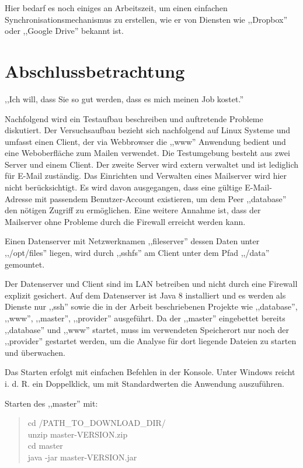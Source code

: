 \documentclass[oneside, ngerman, toc=bibliography,bibliography=totoc,listof=entryprefix, open=right,numbers=noenddot,fontsize=12pt]{scrbook}
\newcommand\chapmd[2]{\begin{mdframed}[%
		rightline=false,leftline=false,topline=false,bottomline=false,frametitlerule=false,
		userdefinedwidth=\textwidth,frametitlealignment=\flushright, %
		frametitlerulecolor=black,frametitle={\small #1}]
		\flushright{} \footnotesize{} #2
	\end{mdframed}}
\begin{document}
\bigskip

Hier bedarf es noch einiges an Arbeitszeit, um einen einfachen Synchronisationsmechanismus zu erstellen, wie er von Diensten wie ,,Dropbox'' oder ,,Google Drive'' bekannt ist.

 
\chapter{Abschlussbetrachtung}
 
\chapmd{Projektmanagementkurs Universität Duisburg-Essen}{,,Ich will, dass Sie so gut werden, dass es mich meinen Job kostet.''}


Nachfolgend wird ein Testaufbau beschreiben und auftretende Probleme diskutiert. Der Versuchsaufbau bezieht sich nachfolgend auf Linux Systeme und umfasst einen Client, der via Webbrowser die ,,www'' Anwendung bedient und eine Weboberfläche zum Mailen verwendet.
Die Testumgebung besteht aus zwei Server und einem Client. Der zweite Server wird extern verwaltet und ist lediglich für E-Mail zuständig. Das Einrichten und Verwalten eines Mailserver wird hier nicht berücksichtigt. Es wird davon ausgegangen, dass eine gültige E-Mail-Adresse mit passendem Benutzer-Account existieren, um dem Peer ,,database'' den nötigen Zugriff zu ermöglichen. Eine weitere Annahme ist, dass der Mailserver ohne Probleme durch die Firewall erreicht werden kann.

Einen Datenserver mit Netzwerknamen ,,fileserver'' dessen Daten unter ,,/opt/files'' liegen, wird durch ,,sshfs'' am Client unter dem Pfad ,,/data'' gemountet.

Der Datenserver und Client sind im LAN betreiben und nicht durch eine Firewall explizit gesichert. Auf dem Datenserver ist Java 8 installiert und es werden als Dienste nur ,,ssh'' sowie die in der Arbeit beschriebenen Projekte wie ,,database'', ,,www'', ,,master'', ,,provider'' ausgeführt. Da der ,,master'' eingebettet bereits ,,database'' und ,,www'' startet, muss im verwendeten Speicherort nur noch der ,,provider'' gestartet werden, um die Analyse für  dort liegende Dateien zu starten und überwachen.

Das Starten erfolgt mit einfachen Befehlen in der Konsole. Unter Windows reicht i. d. R. ein Doppelklick, um mit Standardwerten die Anwendung auszuführen. 

\bigskip

Starten des ,,master'' mit: 
\begin{quote}
    cd /PATH\_TO\_DOWNLOAD\_DIR/ \\
    unzip master-VERSION.zip \\
    cd master \\
    java -jar master-VERSION.jar 
\end{quote}
\end{document}
